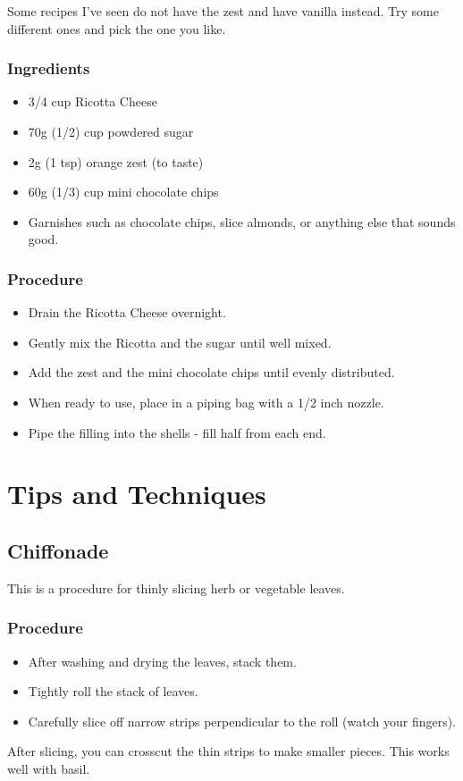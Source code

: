 \documentclass[10pt, openany]{book}
\begin{document}
Some recipes I've seen do not have the zest and have vanilla instead.  Try some different ones and pick the one you like.
\subsection{Ingredients}
\begin{itemize}
  \item 3/4 cup Ricotta Cheese
  \item 70g (1/2) cup powdered sugar
  \item 2g (1 tsp) orange zest (to taste)
  \item 60g (1/3) cup mini chocolate chips
  \item Garnishes such as chocolate chips, slice almonds, or anything else that sounds good.
\end{itemize}
\subsection{Procedure}
\begin{itemize}
  \item Drain the Ricotta Cheese overnight.
  \item Gently mix the Ricotta and the sugar until well mixed.
  \item Add the zest and the mini chocolate chips until evenly distributed.
  \item When ready to use, place in a piping bag with a 1/2 inch nozzle.
  \item Pipe the filling into the shells - fill half from each end.
\end{itemize}

\chapter{Tips and Techniques}

\section{Chiffonade}
\label{tip:Chiffonade}
This is a procedure for thinly slicing herb or vegetable leaves.
\subsection{Procedure}
\begin{itemize}
  \item After washing and drying the leaves, stack them.
  \item Tightly roll the stack of leaves.
  \item Carefully slice off narrow strips perpendicular to the roll (watch your fingers).
\end{itemize}
After slicing, you can crosscut the thin strips to make smaller pieces.  This works well with basil.
\end{document}
